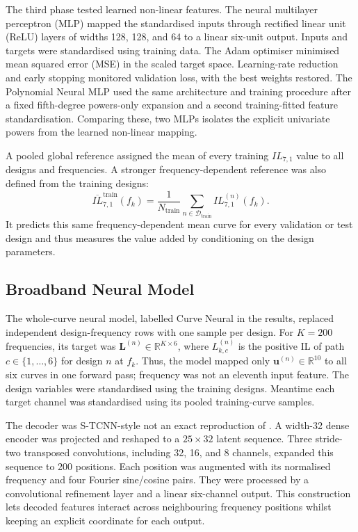 The third phase tested learned non-linear features. The neural multilayer perceptron
(MLP) mapped the standardised inputs through rectified linear unit (ReLU) layers of
widths 128, 128, and 64 to a linear six-unit output. Inputs and targets were
standardised using training data. The Adam optimiser minimised mean squared error (MSE)
in the scaled target space. Learning-rate reduction and early stopping monitored
validation loss, with the best weights restored. The Polynomial Neural MLP used the same
architecture and training procedure after a fixed fifth-degree powers-only expansion and
a second training-fitted feature standardisation. Comparing these, two MLPs isolates the
explicit univariate powers from the learned non-linear mapping.

A pooled global reference assigned the mean of every training $IL_{7,1}$ value to all
designs and frequencies. A stronger frequency-dependent reference was also defined from
the training designs:
\begin{equation}
    \overline{IL}_{7,1}^{\mathrm{train}}(f_k)=
    \frac{1}{N_{\mathrm{train}}}
    \sum_{n\in\mathcal{D}_{\mathrm{train}}}IL_{7,1}^{(n)}(f_k).
    \label{eq:mean-il-reference}
\end{equation}
It predicts this same frequency-dependent mean curve for every validation or test design
and thus measures the value added by conditioning on the design parameters.

\subsection{Broadband Neural Model}
\label{sec:broadband-neural}
The whole-curve neural model, labelled Curve Neural in the results, replaced independent
design-frequency rows with one sample per design. For $K=200$ frequencies, its target
was $\mathbf{L}^{(n)}\in\mathbb{R}^{K\times6}$, where $L_{k,c}^{(n)}$ is the positive IL
of path $c\in\{1,\ldots,6\}$ for design $n$ at $f_k$. Thus, the model mapped only
$\mathbf{u}^{(n)}\in\mathbb{R}^{10}$ to all six curves in one forward pass; frequency
was not an eleventh input feature. The design variables were standardised using the
training designs. Meantime each target channel was standardised using its pooled
training-curve samples.

The decoder was S-TCNN-style not an exact reproduction of \cite{torun2019spectral}. A
width-32 dense encoder was projected and reshaped to a $25\times32$ latent sequence.
Three stride-two transposed convolutions, including 32, 16, and 8 channels, expanded
this sequence to 200 positions. Each position was augmented with its normalised
frequency and four Fourier sine/cosine pairs. They were processed by a convolutional
refinement layer and a linear six-channel output. This construction lets decoded
features interact across neighbouring frequency positions whilst keeping an explicit
coordinate for each output.

